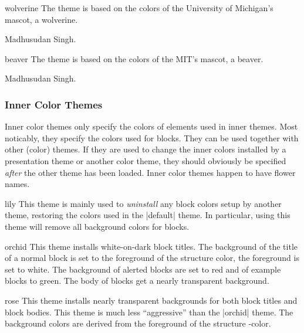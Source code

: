 \begin{colorthemeexample}{wolverine}
  The theme is based on the colors of the University of Michigan's
  mascot, a wolverine.

  \themeauthor Madhusudan Singh.
\end{colorthemeexample}


\begin{colorthemeexample}{beaver}
  The theme is based on the colors of the MIT's mascot, a beaver.

  \themeauthor Madhusudan Singh.
\end{colorthemeexample}


\subsubsection{Inner Color Themes}

Inner color themes only specify the colors of elements used in inner
themes. Most noticably, they specify the colors used for blocks. They can
be used together with other (color) themes. If they are used to change the
inner colors installed by a presentation theme or another color theme,
they should obviously be specified \emph{after} the other theme has
been loaded. Inner color themes happen to have flower names.

\begin{colorthemeexample}{lily}
  This theme is mainly used to \emph{uninstall} any block colors setup
  by another theme, restoring the colors used in the |default|
  theme. In particular, using this theme will remove all background
  colors for blocks.
\end{colorthemeexample}

\begin{colorthemeexample}{orchid}
  This theme installs white-on-dark block titles. The background of
  the title of a normal block is set to the foreground of the
  structure color, the foreground is set to white. The background of
  alerted blocks are set to red and of example blocks to green. The
  body of blocks get a nearly transparent background.
\end{colorthemeexample}

\begin{colorthemeexample}{rose}
  This theme installs nearly transparent backgrounds for both block
  titles and block bodies. This theme is much less ``aggressive'' than
  the |orchid| theme. The background colors are derived from the
  foreground of the structure \beamer-color.
\end{colorthemeexample}


